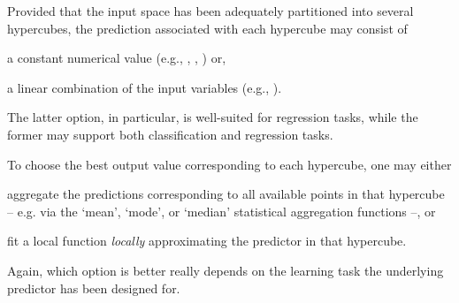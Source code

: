 \documentclass[
]{ceurart}
\begin{document}
Provided that the input space has been adequately partitioned into several hypercubes, the prediction associated with each hypercube may consist of 
%
\begin{inlinelist}
	\item a constant numerical value (e.g., \iter{}, \gridex{}, \cart{}) or, 
	\item a linear combination of the input variables (e.g., \cart{}).
\end{inlinelist}
%
The latter option, in particular, is well-suited for regression tasks, while the former may support both classification and regression tasks.

To choose the best output value corresponding to each hypercube, one may either 
%
\begin{inlinelist}
	\item aggregate the predictions corresponding to all available points in that hypercube -- e.g. via the `mean', `mode', or `median' statistical aggregation functions --, or
	\item fit a local function \emph{locally} approximating the predictor in that hypercube.
\end{inlinelist}
%
Again, which option is better really depends on the learning task the underlying predictor has been designed for.
%

\end{document}

